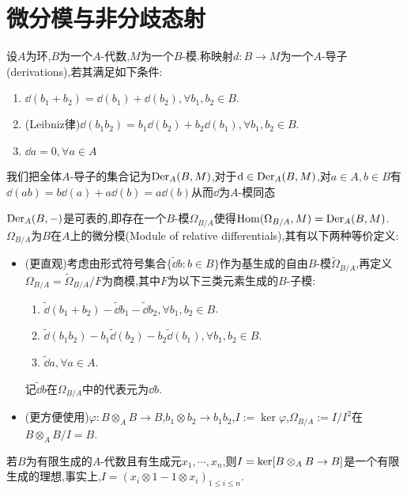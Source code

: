 \section{微分模与非分歧态射}
\begin{definition}[导子]
    设$A$为环,$B$为一个$A$-代数,$M$为一个$B$-模.称映射$d: B \to M$为一个$A$-导子(derivations),若其满足如下条件:
    \begin{enumerate}
        \item $\dd(b_1+b_2) = \dd(b_1)+\dd(b_2),\forall b_1,b_2\in B.$
        \item (Leibniz律)$\dd(b_1b_2) = b_1\dd(b_2)+b_2\dd(b_1) , \forall b_1,b_2 \in B$.
        \item $\dd a = 0,\forall a\in A$
    \end{enumerate}
    我们把全体$A$-导子的集合记为$\operatorname{Der}_A(B,M)$,对于$\mathop{}\!\mathrm{d} \in \operatorname{Der}_A(B,M)$,对$a\in A,b\in B$有$\dd(ab) = b\dd(a)+a\dd(b)=a\dd(b)$从而$\dd$为$A$-模同态
\end{definition}
\begin{definition}[微分模]
    $\operatorname{Der}_A(B,-)$是可表的,即存在一个$B$-模$\Omega_{B/A}$使得$\operatorname{Hom}(\Omega_{B/A},M ) = \operatorname{Der}_A(B,M)$. $\Omega_{B/A}$为$B$在$A$上的微分模(Module of relative differentials),其有以下两种等价定义:
    \begin{itemize}
        \item (更直观)考虑由形式符号集合$\{\tilde{\dd}b:b\in B\}$作为基生成的自由$B$-模$\tilde{\Omega}_{B/A}$,再定义$\Omega_{B/A} = \tilde{\Omega}_{B/A}/F$为商模,其中$F$为以下三类元素生成的$B$-子模:
        \begin{enumerate}
            \item $\tilde{\dd}(b_1+b_2)-\tilde{\dd}b_1-\tilde{\dd}b_2,\forall b_1,b_2\in B$.
            \item $\tilde{\dd}(b_1b_2) - b_1\tilde{\dd}(b_2) - b_2 \tilde{\dd}(b_1),\forall b_1,b_2\in B$.
            \item $\tilde{\dd}a,\forall a\in A$.
        \end{enumerate}
        记$\tilde{\dd}b$在$\Omega_{B/A}$中的代表元为$\dd b$.
        \item (更方便使用)$\varphi : B\otimes_A B \to B$,$b_1\otimes b_2 \to b_1b_2$,$I := \ker \varphi$,$\Omega_{B/A}:= I/I^2$在$B\otimes_AB/I=B$.
    \end{itemize}
\end{definition}
\begin{remark}\label{Rk:DifferentialIdealInFiniteAlg}
    若$B$为有限生成的$A$-代数且有生成元$x_1,\cdots,x_n$,则$I = \operatorname{ker} [B\otimes_A B \to B]$是一个有限生成的理想,事实上,$I = (x_i\otimes 1- 1\otimes x_i)_{1\leq i \leq n}$.
\end{remark}
